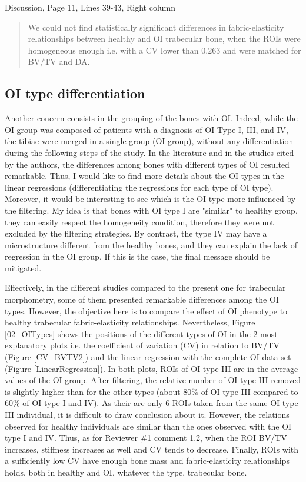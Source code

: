 \documentclass{AR2RC}
\begin{document}
Discussion, Page 11, Lines 39-43, Right column
\begin{quote}
	We could not find statistically significant differences in fabric-elasticity relationships between healthy and OI trabecular bone, when the ROIs were homogeneous enough i.e. with a CV lower than 0.263 and were matched for BV/TV and DA.
\end{quote}

\subsection{OI type differentiation}

\RC Another concern consists in the grouping of the bones with OI. Indeed, while the OI group was composed of patients with a diagnosis of OI Type I, III, and IV, the tibiae were merged in a single group (OI group), without any differentiation during the following steps of the study. In the literature and in the studies cited by the authors, the differences among bones with different types of OI resulted remarkable. Thus, I would like to find more details about the OI types in the linear regressions (differentiating the regressions for each type of OI type). Moreover, it would be interesting to see which is the OI type more influenced by the filtering. My idea is that bones with OI type I are "similar" to healthy group, they can easily respect the homogeneity condition, therefore they were not excluded by the filtering strategies. By contrast, the type IV may have a microstructure different from the healthy bones, and they can explain the lack of regression in the OI group. If this is the case, the final message should be mitigated.

\AR Effectively, in the different studies compared to the present one for trabecular morphometry, some of them presented remarkable differences among the OI types. However, the objective here is to compare the effect of OI phenotype to healthy trabecular fabric-elasticity relationships. Nevertheless, Figure \ref{02_OITypes} shows the positions of the different types of OI in the 2 most explanatory plots i.e. the coefficient of variation (CV) in relation to BV/TV (Figure \ref{CV_BVTV2}) and the linear regression with the complete OI data set (Figure \ref{LinearRegression}). In both plots, ROIs of OI type III are in the average values of the OI group. After filtering, the relative number of OI type III removed is slightly higher than for the other types (about 80\% of OI type III compared to 60\% of OI type I and IV). As their are only 6 ROIs taken from the same OI type III individual, it is difficult to draw conclusion about it. However, the relations observed for healthy individuals are similar than the ones observed with the OI type I and IV. Thus, as for Reviewer \#1 comment 1.2, when the ROI BV/TV increases, stiffness increases as well and CV tends to decrease. Finally, ROIs with a sufficiently low CV have enough bone mass and fabric-elasticity relationships holds, both in healthy and OI, whatever the type, trabecular bone.
\end{document}
